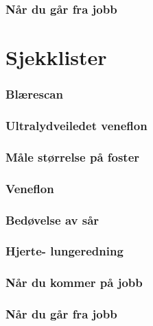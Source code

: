 \documentclass[a4paper,12pt,twoside]{memoir}
\begin{document}
				\section{Når du går fra jobb}
		




	\part{Sjekklister}
		\section{Blærescan}
		\section{Ultralydveiledet veneflon}
		\section{Måle størrelse på foster}
		\section{Veneflon}
		\section{Bedøvelse av sår}
		\section{Hjerte- lungeredning}
		\section{Når du kommer på jobb}
		\section{Når du går fra jobb}




\backmatter

 
     
	{}
	     
	
	
	\listoffigures
	
	\listoftables
\end{document}
